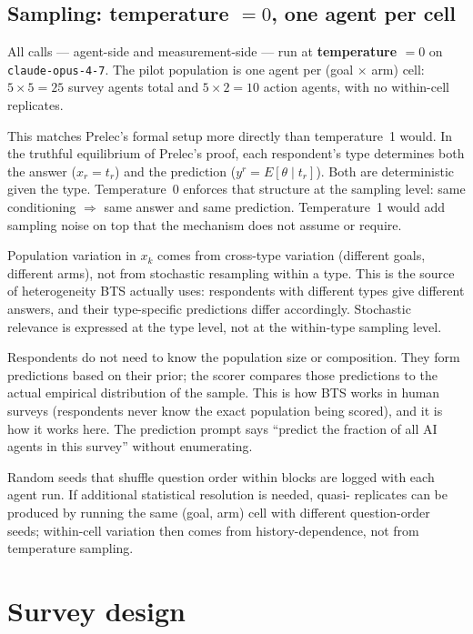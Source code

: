 \documentclass[11pt]{article}
\begin{document}
\subsection{Sampling: temperature $= 0$, one agent per cell}

All calls — agent-side and measurement-side — run at \textbf{temperature
$= 0$} on \texttt{claude-opus-4-7}. The pilot population is one agent per
(goal $\times$ arm) cell: $5 \times 5 = 25$ survey agents total and $5 \times 2 = 10$
action agents, with no within-cell replicates.

This matches Prelec's formal setup more directly than temperature~1 would.
In the truthful equilibrium of Prelec's proof, each respondent's type
determines both the answer ($x_r = t_r$) and the prediction ($y^r = E[\theta
\mid t_r]$). Both are deterministic given the type. Temperature~0 enforces
that structure at the sampling level: same conditioning $\Rightarrow$ same
answer and same prediction. Temperature~1 would add sampling noise on top
that the mechanism does not assume or require.

Population variation in $x_k$ comes from cross-type variation (different
goals, different arms), not from stochastic resampling within a type. This
is the source of heterogeneity BTS actually uses: respondents with different
types give different answers, and their type-specific predictions differ
accordingly. Stochastic relevance is expressed at the type level, not at
the within-type sampling level.

Respondents do not need to know the population size or composition. They
form predictions based on their prior; the scorer compares those
predictions to the actual empirical distribution of the sample. This is
how BTS works in human surveys (respondents never know the exact population
being scored), and it is how it works here. The prediction prompt says
``predict the fraction of all AI agents in this survey'' without
enumerating.

Random seeds that shuffle question order within blocks are logged with
each agent run. If additional statistical resolution is needed, quasi-
replicates can be produced by running the same (goal, arm) cell with
different question-order seeds; within-cell variation then comes from
history-dependence, not from temperature sampling.

\section{Survey design}
\end{document}
